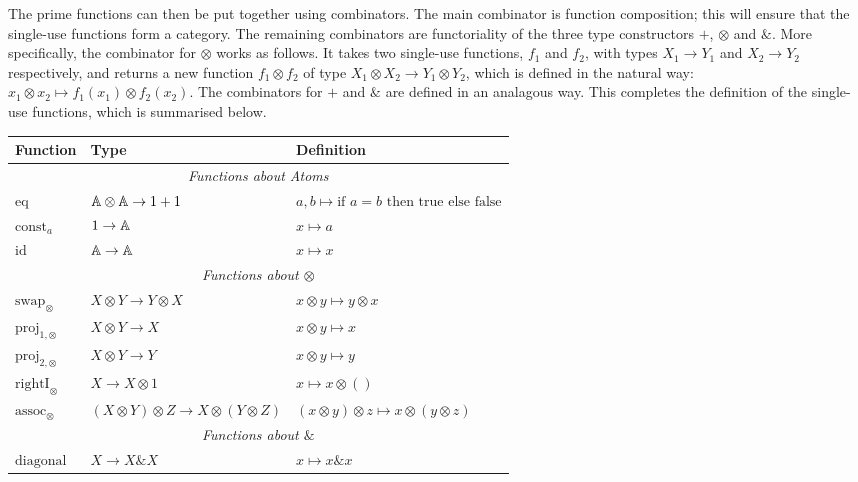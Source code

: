 The prime functions can then be put together using combinators. The main combinator is function composition; this will ensure that the single-use functions form a category. The remaining combinators are functoriality of the three type constructors $+$, $\otimes$ and $\&$. More specifically, the combinator for $\otimes$ works as follows. It takes two single-use functions, $f_1$ and $f_2$, with types $X_1 \to Y_1$ and $X_2 \to Y_2$ respectively, and returns a new function $f_1 \otimes f_2$ of type $X_1 \otimes X_2 \to Y_1 \otimes Y_2$, which is defined in the natural way: $x_1 \otimes x_2 \mapsto f_1(x_1) \otimes f_2(x_2)$.  The combinators for $+$ and $\&$ are defined in an analagous way. This completes the definition of the single-use functions, which is  summarised below.
\begin{table}[h!]
    \centering
    \begin{tabular}{lll}
        \hline
        \textbf{Function} & \textbf{Type} & \textbf{Definition} \\
        \hline
        \multicolumn{3}{c}{\textit{Functions about Atoms}} \\
        \hline
        $\textrm{eq}$ & $\mathbb A \otimes \mathbb A \to 1 + 1$ & $a, b \mapsto \text{if } a = b \text{ then true else false}$ \\
        $\textrm{const}_a$ & $1 \to \mathbb A$ & $x \mapsto a$ \\
        $\textrm{id}$ & $\mathbb A \to \mathbb A$ & $x \mapsto x$ \\
        \hline
        \multicolumn{3}{c}{\textit{Functions about \(\otimes\)}} \\
        \hline
        $\textrm{swap}_{\otimes}$ & $X \otimes Y \to Y \otimes X$ & $x \otimes y \mapsto y \otimes x$ \\
        $\textrm{proj}_{1, \otimes}$ & $X \otimes Y \to X$ & $x \otimes y \mapsto x$ \\
        $\textrm{proj}_{2, \otimes}$ & $X \otimes Y \to Y$ & $x \otimes y \mapsto y$ \\
        $\textrm{rightI}_{\otimes}$ & $ X \to X \otimes 1$ & $x \mapsto x \otimes ()$ \\
        $\textrm{assoc}_{\otimes}$ & $(X \otimes Y) \otimes Z \to X \otimes (Y \otimes Z)$ & $(x \otimes y) \otimes z \mapsto x \otimes (y \otimes z)$ \\
        \hline
        \multicolumn{3}{c}{\textit{Functions about \(\&\)}} \\
        \hline
        $\textrm{diagonal}$ & $X \to X \& X$ & $x \mapsto x \& x$ \\

\end{tabular}
\end{table}
